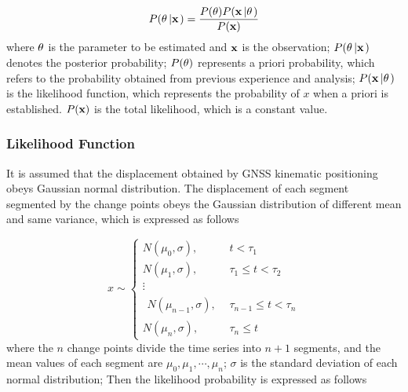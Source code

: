 \documentclass[final,3p,times]{elsarticle}
\begin{document}
	\begin{equation}\label{eq_bayesian_inference}
	P({\bf{\theta }}\left| {\bf{x}} \right.) = \frac{{P({\bf{\theta }})P({\bf{x}}\left| {\bf{\theta }} \right.)}}{{P({\bf{x}})}}
	\end{equation}
	where $\bf{\theta }$ is the parameter to be estimated and $\bf{x}$ is the observation; $P({\bf{\theta }}\left| {\bf{x}} \right.)$ denotes the posterior probability; $P({\bf{\theta }})$ represents a priori probability, which refers to the probability obtained from previous experience and analysis;
	$P({\bf{x}}\left| {\bf{\theta }} \right.)$ is the likelihood function, which represents the probability of $x$ when a priori is established. ${P({\bf{x}})}$ is the total likelihood, which is a constant value.
	
	\subsubsection{Likelihood Function}
	It is assumed that the displacement obtained by GNSS kinematic positioning obeys Gaussian normal distribution.  The displacement of each segment segmented by the change points obeys the Gaussian distribution of different mean and same variance, which is expressed as follows
	
	\begin{equation}\label{eq_ts_cps}
	x \sim \left\{ {\begin{array}{*{20}{r}}
		{N({\mu _0},\sigma ),}&{t < {\tau _1}}\\
		{N({\mu _1},\sigma ),}&{{\tau _1} \le t < {\tau _2}}\\
		\vdots &{}\\
		{\begin{array}{*{20}{c}}
			{N({\mu _{n-1}},\sigma ),}
			\end{array}}&{{\tau _{n - 1}} \le t < {\tau _n}}\\
		{N({\mu _{n}},\sigma ),}&{{\tau _n} \le t}
		\end{array}} \right.
	\end{equation}
	where the $n$ change points divide the time series into $n+1$ segments, and the mean values of each segment are ${\mu _0},{\mu _1},\cdots,{\mu _n}$; $\sigma$ is the standard deviation of each normal distribution; Then the likelihood probability is expressed as follows
	
\end{document}
